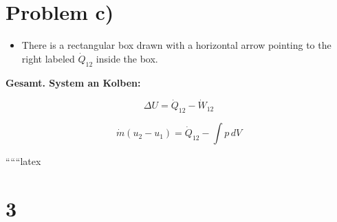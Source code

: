 \section*{Problem c)}

\begin{itemize}
    \item There is a rectangular box drawn with a horizontal arrow pointing to the right labeled \( \dot{Q}_{12} \) inside the box.
\end{itemize}

\textbf{Gesamt. System an Kolben:}

\[
\Delta U = \dot{Q}_{12} - \dot{W}_{12}
\]

\[
\dot{m} (u_2 - u_1) = \dot{Q}_{12} - \int p \, dV
\]

``````latex


\section*{3}